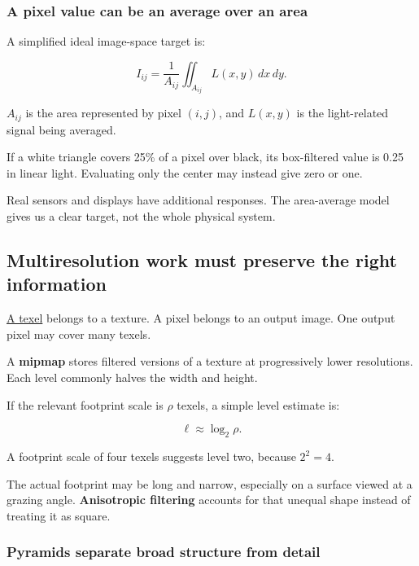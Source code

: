 \subsubsection{A pixel value can be an average over an area}\label{04-visual-computing-ii-ch043-a-pixel-value-can-be-an-average-over-an-area}

A simplified ideal image-space target is:

\[
I_{ij}=\frac1{A_{ij}}\iint_{A_{ij}}L(x,y)\,dx\,dy.
\]

\(A_{ij}\) is the area represented by pixel \((i,j)\), and \(L(x,y)\) is the light-related signal being averaged.

If a white triangle covers 25\% of a pixel over black, its box-filtered value is 0.25 in linear light. Evaluating only the center may instead give zero or one.

Real sensors and displays have additional responses. The area-average model gives us a clear target, not the whole physical system.

\subsection{Multiresolution work must preserve the right information}\label{04-visual-computing-ii-ch043-multiresolution-work-must-preserve-the-right-information}

\hyperref[appendix-b677a85ba76f]{A texel} belongs to a texture. A pixel belongs to an output image. One output pixel may cover many texels.

A \textbf{mipmap} stores filtered versions of a texture at progressively lower resolutions. Each level commonly halves the width and height.

If the relevant footprint scale is \(\rho\) texels, a simple level estimate is:

\[
\ell\approx\log_2\rho.
\]

A footprint scale of four texels suggests level two, because \(2^2=4\).

The actual footprint may be long and narrow, especially on a surface viewed at a grazing angle. \textbf{Anisotropic filtering} accounts for that unequal shape instead of treating it as square.

\subsubsection{Pyramids separate broad structure from detail}\label{04-visual-computing-ii-ch043-pyramids-separate-broad-structure-from-detail}

